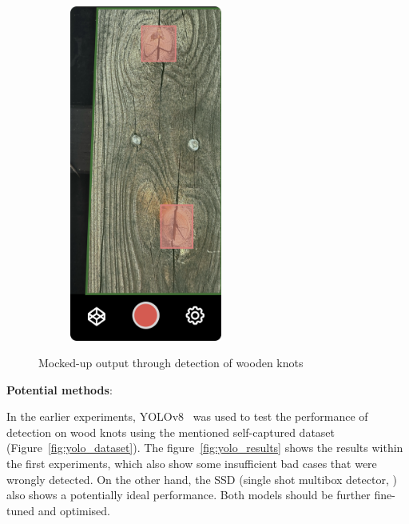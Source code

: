 \begin{figure}[ht]
\begin{subfigure}[b]{0.4\textwidth}
        \includegraphics[width=0.55\textwidth]{Master Thesis/Images/Section_3/Mock/3-Mock3.png}
    \end{subfigure}
  \caption{Mocked-up output through detection of wooden knots}   
    \label{fig:mock2}
\end{figure}  

\textbf{Potential methods}:

In the earlier experiments, YOLOv8~\citep{yolov8_ultralytics} was used to test the performance of detection on wood knots using the mentioned self-captured dataset (Figure~\ref{fig:yolo_dataset}). The figure~\ref{fig:yolo_results} shows the results within the first experiments, which also show some insufficient bad cases that were wrongly detected. On the other hand, the SSD (single shot multibox detector, \citep{jia2014caffe}) also shows a potentially ideal performance. Both models should be further fine-tuned and optimised. 

